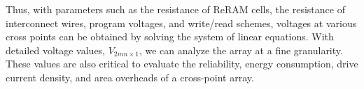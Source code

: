 %
%
Thus, with parameters such as the resistance of ReRAM cells, the
resistance of interconnect wires, program voltages, and write/read
schemes, voltages at various cross points can be obtained by solving the
system of linear equations. With detailed voltage values,
$V_{2mn{\times}1}$, we can analyze the array at a fine granularity. These
values are also critical to evaluate the reliability, energy consumption,
drive current density, and area overheads of a cross-point array.
